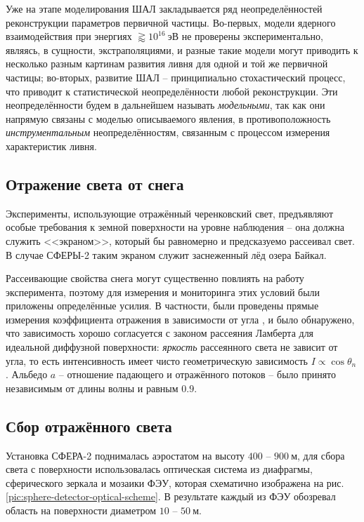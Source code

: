 Уже на этапе моделирования ШАЛ закладывается ряд неопределённостей реконструкции параметров первичной частицы. Во-первых, модели ядерного взаимодействия при энергиях $\gtrapprox 10^{16}~\text{эВ}$ не проверены экспериментально, являясь, в сущности, экстраполяциями, и разные такие модели могут приводить к несколько разным картинам развития ливня для одной и той же первичной частицы; во-вторых, развитие ШАЛ -- принципиально стохастический процесс, что приводит к статистической неопределённости любой реконструкции. Эти неопределённости будем в дальнейшем называть \textit{модельными}, так как они напрямую связаны с моделью описываемого явления, в противоположность \textit{инструментальным} неопределённостям, связанным с процессом измерения характеристик ливня.

\subsection{Отражение света от снега}
\label{sect:snow-reflection}

Эксперименты, использующие отражённый черенковский свет, предъявляют особые требования к земной поверхности на уровне наблюдения -- она должна служить <<экраном>>, который бы равномерно и предсказуемо рассеивал свет. В случае СФЕРЫ-2 таким экраном служит заснеженный лёд озера Байкал.

Рассеивающие свойства снега могут существенно повлиять на работу эксперимента, поэтому для измерения и мониторинга этих условий были приложены определённые усилия. В частности, были проведены прямые измерения коэффициента отражения в зависимости от угла \cite[рис.~11]{Sphere2015}, и было обнаружено, что зависимость хорошо согласуется с законом рассеяния Ламберта для идеальной диффузной поверхности: \textit{яркость} рассеянного света не зависит от угла, то есть интенсивность имеет чисто геометрическую зависимость $I \propto \cos \theta_n$ \cite{Antonov2019}. Альбедо $a$ -- отношение падающего и отражённого потоков -- было принято независимым от длины волны \cite{Warren1982} и равным $0.9$.

\subsection{Сбор отражённого света}

Установка СФЕРА-2 поднималась аэростатом на высоту $400$ -- $900~\text{м}$, для сбора света с поверхности использовалась оптическая система из диафрагмы, сферического зеркала и мозаики ФЭУ, которая схематично изображена на рис. \ref{pic:sphere-detector-optical-scheme}. В результате каждый из ФЭУ обозревал область на поверхности диаметром $10$ -- $50~\text{м}$.

